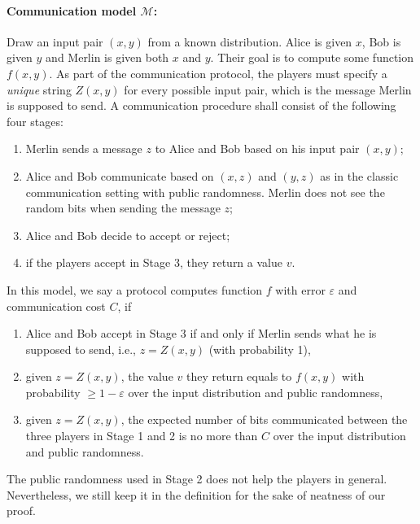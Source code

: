 \documentclass[11pt]{article}
\begin{document}
\paragraph*{Communication model $\mathcal{M}$:}

Draw an input pair $(x, y)$ from a known distribution. Alice is given $x$, Bob is given $y$ and Merlin is given both $x$ and $y$. Their goal is to compute some function $f(x, y)$. As part of the communication protocol, the players must specify a \emph{unique} string $Z(x, y)$ for every possible input pair, which is the message Merlin is supposed to send. A communication procedure shall consist of the following four stages:

\begin{enumerate}
	\item
		Merlin sends a message $z$ to Alice and Bob based on his input pair $(x, y)$; 
	\item
		Alice and Bob communicate based on $(x, z)$ and $(y, z)$ as in the classic communication setting with public randomness. Merlin does not see the random bits when sending the message $z$;
	\item
		Alice and Bob decide to accept or reject;
	\item
		if the players accept in Stage 3, they return a value $v$.
\end{enumerate}

In this model, we say a protocol computes function $f$ with error $\varepsilon$ and communication cost $C$, if 
\begin{enumerate}
	\item
		Alice and Bob accept in Stage 3 if and only if Merlin sends what he is supposed to send, i.e., $z=Z(x, y)$ (with probability 1),
	\item
		given $z=Z(x, y)$, the value $v$ they return equals to $f(x, y)$ with probability $\geq 1-\varepsilon$ over the input distribution and public randomness,
	\item
		given $z=Z(x, y)$, the expected number of bits communicated between the three players in Stage 1 and 2 is no more than $C$ over the input distribution and public randomness.
\end{enumerate}


\begin{remark}
The public randomness used in Stage 2 does not help the players in general. Nevertheless, we still keep it in the definition for the sake of neatness of our proof. 
\end{remark}
\end{document}
